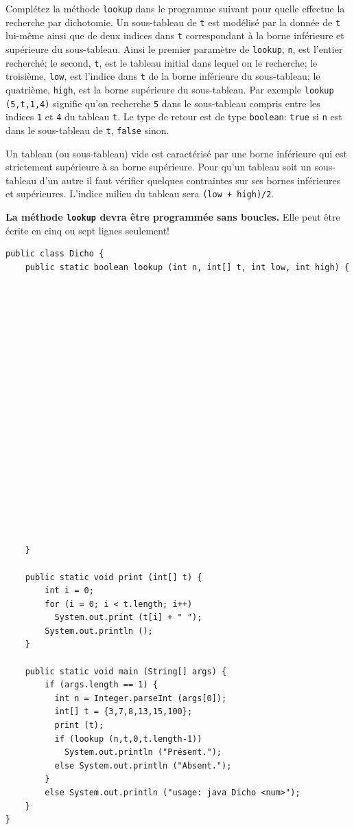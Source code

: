 \documentclass[10pt,a4paper]{article}
\begin{document}
Complétez la méthode {\small \verb+lookup+} dans le programme suivant
pour quelle effectue la recherche par dichotomie. Un sous-tableau de
{\small \verb+t+} est modélisé par la donnée de {\small \verb+t+}
lui-même ainsi que de deux indices dans {\small \verb+t+}
correspondant à la borne inférieure et supérieure du
sous-tableau. Ainsi le premier paramètre de {\small \verb+lookup+},
{\small \verb+n+}, est l'entier recherché; le second, {\small
\verb+t+}, est le tableau initial dans lequel on le recherche; le
troisième, {\small \verb+low+}, est l'indice dans {\small \verb+t+} de
la borne inférieure du sous-tableau; le quatrième, {\small
\verb+high+}, est la borne supérieure du sous-tableau. Par exemple
{\small \verb+lookup (5,t,1,4)+} signifie qu'on recherche {\small
\verb+5+} dans le sous-tableau compris entre les indices {\small
\verb+1+} et {\small \verb+4+} du tableau {\small \verb+t+}. Le type
de retour est de type {\small \verb+boolean+}: {\small \verb+true+} si
{\small \verb+n+} est dans le sous-tableau de {\small \verb+t+},
{\small \verb+false+} sinon.

Un tableau (ou sous-tableau) vide est caractérisé par une borne
inférieure qui est strictement supérieure à sa borne supérieure. Pour
qu'un tableau soit un sous-tableau d'un autre il faut vérifier
quelques contraintes sur ses bornes inférieures et
supérieures. L'indice milieu du tableau sera {\small
\verb|(low + high)/2|}.

\medskip

\noindent \textbf{La méthode \texttt{lookup} devra être programmée sans
boucles.} Elle peut être écrite en cinq ou sept lignes seulement!

\newpage

{\small
\begin{verbatim}
public class Dicho {
    public static boolean lookup (int n, int[] t, int low, int high) {




















    }

    public static void print (int[] t) {
        int i = 0;
        for (i = 0; i < t.length; i++)
          System.out.print (t[i] + " ");
        System.out.println ();
    }

    public static void main (String[] args) {
        if (args.length == 1) {
          int n = Integer.parseInt (args[0]);
          int[] t = {3,7,8,13,15,100};
          print (t);
          if (lookup (n,t,0,t.length-1))
            System.out.println ("Présent.");
          else System.out.println ("Absent.");
        }
        else System.out.println ("usage: java Dicho <num>");
    }
}
\end{verbatim}
}
\end{document}
